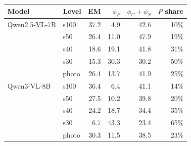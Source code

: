 \begin{tabular}{@{}llrrrr@{}}
\toprule
Model & Level & EM & $\phi_P$ & $\phi_C+\phi_S$ & $P$ share \\
\midrule
Qwen2.5-VL-7B & s100 & 37.2 & 4.9 & 42.6 & 10\% \\
 & s50 & 26.4 & 11.0 & 47.9 & 19\% \\
 & s40 & 18.6 & 19.1 & 41.8 & 31\% \\
 & s30 & 15.3 & 30.3 & 30.2 & 50\% \\
 & photo & 26.4 & 13.7 & 41.9 & 25\% \\
\addlinespace
Qwen3-VL-8B & s100 & 36.4 & 6.4 & 41.1 & 14\% \\
 & s50 & 27.5 & 10.2 & 39.8 & 20\% \\
 & s40 & 24.2 & 18.7 & 34.4 & 35\% \\
 & s30 & 6.7 & 43.3 & 23.4 & 65\% \\
 & photo & 30.3 & 11.5 & 38.5 & 23\% \\
\bottomrule
\end{tabular}
